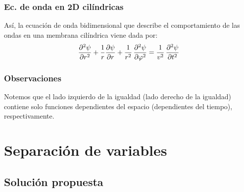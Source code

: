 \documentclass[12pt]{beamer}
\begin{document}
\begin{frame}
\frametitle{Ec. de onda en 2D cilíndricas}
Así, la ecuación de onda bidimensional que describe el comportamiento de las ondas en una membrana cilíndrica viene dada por:
\pause
\begin{align*}
\pdv[2]{\psi}{r} + \dfrac{1}{r} \pdv{\psi}{r} + \dfrac{1}{r^{2}} \, \pdv[2]{\psi}{\varphi} = \dfrac{1}{v^{2}} \, \pdv[2]{\psi}{t}
\end{align*}
\end{frame}
\begin{frame}
\frametitle{Observaciones}
Notemos que el lado izquierdo de la igualdad (lado derecho de la igualdad) contiene solo funciones dependientes del espacio (dependientes del tiempo), respectivamente.
\end{frame}

\section{Separación de variables}
\subsection{Solución propuesta}
\end{document}
